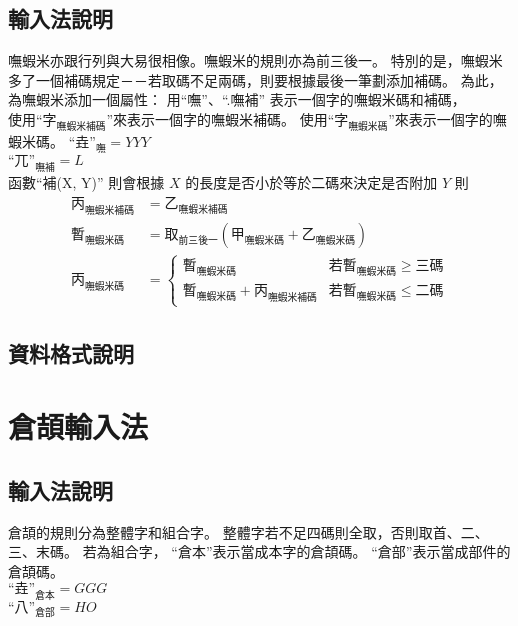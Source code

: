 \documentclass{article}
\begin{document}
\subsection{輸入法說明}
嘸蝦米亦跟行列與大易很相像。嘸蝦米的規則亦為前三後一。
特別的是，嘸蝦米多了一個補碼規定－－若取碼不足兩碼，則要根據最後一筆劃添加補碼。
為此，為嘸蝦米添加一個屬性：
用``嘸''、``.嘸補'' 表示一個字的嘸蝦米碼和補碼，\\
使用``$\mbox{字}_{\mbox{嘸蝦米補碼}}$''來表示一個字的嘸蝦米補碼。
使用``$\mbox{字}_{\mbox{嘸蝦米碼}}$''來表示一個字的嘸蝦米碼。
$\mbox{``垚''}_{\mbox{嘸}}=YYY$\\
$\mbox{``兀''}_{\mbox{嘸補}}=L$\\
函數``\mbox{補}(X, Y)'' 則會根據 $X$ 的長度是否小於等於二碼來決定是否附加 $Y$
則
\begin{subequations}
  \begin{align}
  \mbox{丙}_{\mbox{嘸蝦米補碼}}&=\mbox{乙}_{\mbox{嘸蝦米補碼}}\\
  \mbox{暫}_{\mbox{嘸蝦米碼}}&=\mbox{取}_{\mbox{前三後一}}(\mbox{甲}_{\mbox{嘸蝦米碼}}+\mbox{乙}_{\mbox{嘸蝦米碼}})\\
  \mbox{丙}_{\mbox{嘸蝦米碼}}&= \left\{\begin{array}{ll}
        \mbox{暫}_{\mbox{嘸蝦米碼}} & \mbox{若$\mbox{暫}_{\mbox{嘸蝦米碼}} \geq $三碼}\\
        \mbox{暫}_{\mbox{嘸蝦米碼}}+\mbox{丙}_{\mbox{嘸蝦米補碼}} & \mbox{若$\mbox{暫}_{\mbox{嘸蝦米碼}} \leq $二碼}
      \end{array}\right.
  \end{align}
\end{subequations}

\subsection{資料格式說明}

\section{倉頡輸入法}
\subsection{輸入法說明}

倉頡的規則分為整體字和組合字。
整體字若不足四碼則全取，否則取首、二、三、末碼。
若為組合字，
``倉本''表示當成本字的倉頡碼。
``倉部''表示當成部件的倉頡碼。\\
$\mbox{``垚''}_{\mbox{倉本}}=GGG$\\
$\mbox{``八''}_{\mbox{倉部}}=HO$\\
\end{document}
